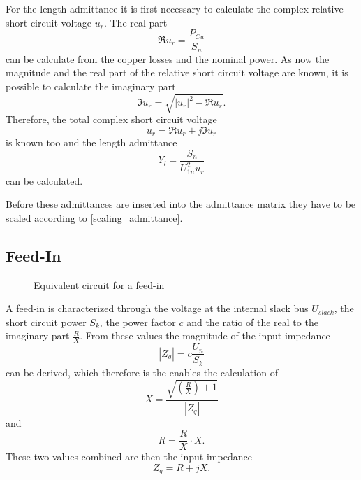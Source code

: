 For the length admittance it is first necessary to calculate the complex relative short circuit voltage $u_r$. The real part
\begin{equation}
	\Re{u_r} = \frac{P_{Cu}}{S_n}
\end{equation}
can be calculate from the copper losses and the nominal power. As now the magnitude and the real part of the relative short circuit voltage are known, it is possible to calculate the imaginary part
\begin{equation}
	\Im{u_r} = \sqrt{|u_r|^2 - \Re{u_r}}.
\end{equation}
Therefore, the total complex short circuit voltage
\begin{equation}
	u_r = \Re{u_r} + j \Im{u_r}
\end{equation}
is known too and the length admittance
\begin{equation}
	Y_l = \frac{S_n}{U_{1n}^2 u_r}
\end{equation}
can be calculated.

Before these admittances are inserted into the admittance matrix they have to be scaled according to \eqref{scaling_admittance}.

\subsection{Feed-In}

\begin{figure}
	\centering
	
	\caption{Equivalent circuit for a feed-in}
	\label{fig:feedin}
\end{figure}

A feed-in  is characterized through the voltage at the internal slack bus $U_{slack}$, the short circuit power $S_k$, the power factor $c$ and the ratio of the real to the imaginary part $\frac{R}{X}$. From these values the magnitude of the input impedance 
\begin{equation}
	|Z_q| = c \frac{U_n}{S_k}
\end{equation}
can be derived, which therefore is the enables the calculation of
\begin{equation}
	X = \frac{\sqrt{\left( \frac{R}{X} \right) + 1}}{|Z_q|}
\end{equation}
and
\begin{equation}
	R = \frac{R}{X} \cdot X.
\end{equation}
These two values combined are then the input impedance
\begin{equation}
	Z_q = R + j X.
\end{equation}

